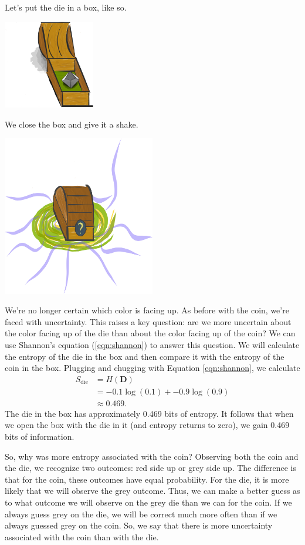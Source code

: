Let's put the die in a box, like so.
\begin{center}
\includegraphics[width=0.3\textwidth]{img/small-box-open-die}
\end{center}
We close the box and give it a shake.
\begin{center}
\includegraphics[width=0.5\textwidth]{img/small-box-closed-portal}
\end{center}
We're no longer certain which color is facing up.
As before with the coin, we're faced with uncertainty.
This raises a key question: are we more uncertain about the color facing up of the die than about the color facing up of the coin?
We can use Shannon's equation (\ref{eqn:shannon}) to answer this question.
We will calculate the entropy of the die in the box and then compare it with the entropy of the coin in the box.
Plugging and chugging with Equation \ref{eqn:shannon}, we calculate
\begin{align*}
S_{\text{die}}
&= H(\bm{D}) \\
&= -0.1 \log(0.1) + -0.9 \log(0.9) \\
&\approx 0.469.
\end{align*}
The die in the box has approximately 0.469 bits of entropy.
It follows that when we open the box with the die in it (and entropy returns to zero), we gain 0.469 bits of information.

So, why was more entropy associated with the coin?
Observing both the coin and the die, we recognize two outcomes: red side up or grey side up.
The difference is that for the coin, these outcomes have equal probability.
For the die, it is more likely that we will observe the grey outcome.
Thus, we can make a better guess as to what outcome we will observe on the grey die than we can for the coin.
If we always guess grey on the die, we will be correct much more often than if we always guessed grey on the coin.
So, we say that there is more uncertainty associated with the coin than with the die.
